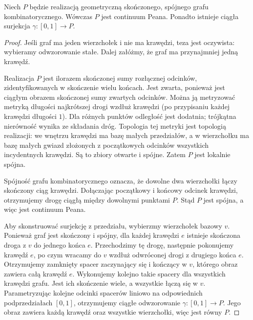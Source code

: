 \begin{twierdzenie}
\label{thm:topog25-finite-graph-peano}
Niech \(P\) będzie realizacją
geometryczną skończonego,
spójnego grafu kombinatorycznego.
Wówczas \(P\) jest continuum Peana.
Ponadto istnieje ciągła surjekcja
\(\gamma\colon[0,1]\to P\).
\end{twierdzenie}
\begin{proof}
Jeśli graf ma jeden wierzchołek
i nie ma krawędzi, teza jest oczywista:
wybieramy odwzorowanie stałe.
Dalej załóżmy, że graf ma
przynajmniej jedną krawędź.

Realizacja \(P\) jest ilorazem
skończonej sumy rozłącznej
odcinków, zidentyfikowanych
w skończenie wielu końcach.
Jest zwarta, ponieważ
jest ciągłym obrazem
skończonej sumy zwartych odcinków.
Można ją metryzować
metryką długości najkrótszej
drogi wzdłuż krawędzi
(po przypisaniu każdej krawędzi
długości \(1\)).
Dla różnych punktów odległość
jest dodatnia; trójkątna nierówność
wynika ze składania dróg.
Topologia tej metryki jest
topologią realizacji:
we wnętrzu krawędzi ma bazę
małych przedziałów, a w wierzchołku
ma bazę małych gwiazd
złożonych z początkowych odcinków
wszystkich incydentnych krawędzi.
Są to zbiory otwarte i spójne.
Zatem \(P\) jest lokalnie spójna.

Spójność grafu kombinatorycznego
oznacza, że dowolne dwa wierzchołki
łączy skończony ciąg krawędzi.
Dołączając początkowy i końcowy
odcinek krawędzi, otrzymujemy
drogę ciągłą między dowolnymi
punktami \(P\).
Stąd \(P\) jest spójna,
a więc jest continuum Peana.

Aby skonstruować surjekcję
z przedziału, wybierzmy wierzchołek
bazowy \(v\).
Ponieważ graf jest skończony i spójny,
dla każdej krawędzi \(e\)
istnieje skończona droga z \(v\)
do jednego końca \(e\).
Przechodzimy tę drogę,
następnie pokonujemy krawędź \(e\),
po czym wracamy do \(v\)
wzdłuż odwróconej drogi
z drugiego końca \(e\).
Otrzymujemy zamknięty spacer
zaczynający się i kończący w \(v\),
którego obraz zawiera całą krawędź \(e\).
Wykonujemy kolejno takie spacery
dla wszystkich krawędzi grafu.
Jest ich skończenie wiele,
a wszystkie łączą się w \(v\).
Parametryzując kolejne odcinki
spacerów liniowo na odpowiednich
podprzedziałach \([0,1]\),
otrzymujemy ciągłe odwzorowanie
\(\gamma\colon[0,1]\to P\).
Jego obraz zawiera każdą krawędź
oraz wszystkie wierzchołki,
więc jest równy \(P\).
\end{proof}

